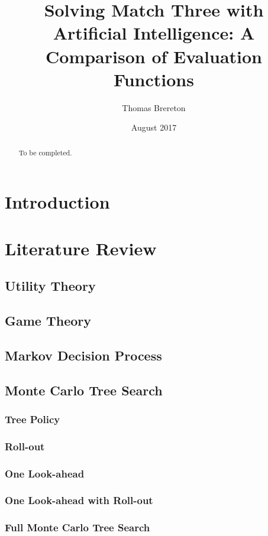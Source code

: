 \documentclass{bhamthesis}
\title{Solving Match Three with Artificial Intelligence: A Comparison of Evaluation Functions}
\author{Thomas Brereton}
\date{August 2017}  %
\makeatletter
\theoremstyle{definition}
\newcommand{\makecrestcover}{%
\begin{titlepage}
\centering\singlespacing
\vspace*{1cm}
{\huge\bfseries University of Birmingham\par}
\vspace*{2cm}
\texttt{[image: crest]}\par
\vspace*{\stretch{1}}
{\Huge\bfseries
\@author\par
\vspace{1cm}
\@title\par}
\vspace*{\stretch{1}}
{\Large\@date\par}
\end{titlepage}
}
\makeatother
\begin{document}
\frontmatter

\maketitle


\begin{abstract}
To be completed.
\end{abstract}

\tableofcontents


\mainmatter
\chapter{Introduction}
\blindtext

\chapter{Literature Review}
\section{Utility Theory}
\section{Game Theory}
\section{Markov Decision Process}
\section{Monte Carlo Tree Search}
\subsection{Tree Policy}
\subsection{Roll-out}
\subsection{One Look-ahead}
\subsection{One Look-ahead with Roll-out}
\subsection{Full Monte Carlo Tree Search}
\end{document}
